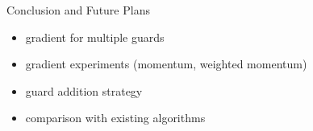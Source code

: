 \documentclass{beamer}
\begin{document}
\begin{frame}{Conclusion and Future Plans}
	\begin{itemize}
		\item gradient for multiple guards
		\pause
		\item gradient experiments (momentum, weighted momentum)
		\pause
		\item guard addition strategy
		\pause
		\item comparison with existing algorithms \cite{DBLP:journals/corr/abs-2007-06920}
	\end{itemize}
\end{frame}








\end{document}
